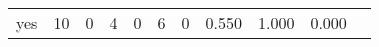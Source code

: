 \begin{longtable}{lp{1.10cm}p{1.10cm}p{1.10cm}p{1.10cm}p{1.10cm}p{1.10cm}p{1.10cm}p{1.10cm}p{1.10cm}p{1.10cm}}
yes       &                     10 &                                  0 &                                 4 &                                0 &                                 6 &                               0 &                          0.550 &                                 1.000 &                               0.000 \\
\end{longtable}
